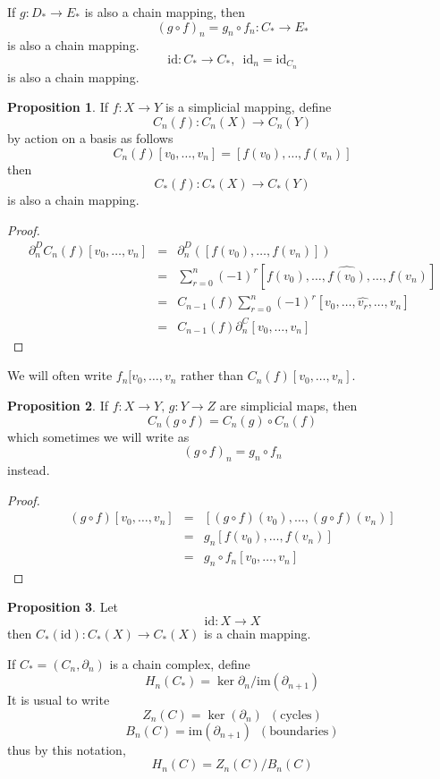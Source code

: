 \documentclass[a4paper,14pt]{extarticle}
\theoremstyle{definition}
\newtheorem*{proposition}{Proposition}
\begin{document}
If $g:D_*\rightarrow E_*$ is also a chain mapping, then \[(g\circ f)_n=g_n\circ f_n:C_*\rightarrow E_*\] is also a chain mapping. \[\text{id}:C_*\rightarrow C_*,
\,\,\,\text{id}_n=\text{id}_{C_n}\] is also a chain mapping. \\

\begin{proposition}
If $f:X\rightarrow Y$ is a simplicial mapping, define \[C_n(f):C_n(X)\rightarrow C_n(Y)\] by action on a basis as follows
\[C_n(f)[v_0,\ldots,v_n]=[f(v_0),\ldots,f(v_n)]\] then \[C_*(f):C_*(X)\rightarrow C_*(Y)\] is also a chain mapping.
\end{proposition}

\begin{proof}
\begin{eqnarray*}
	\partial_n^DC_n(f)[v_0,\ldots,v_n]&=&\partial_n^D([f(v_0),\ldots,f(v_n)]) \\
		&=&\sum_{r=0}^n (-1)^r[f(v_0),\ldots,\hat{f(v_0)},\ldots,f(v_n)] \\
		&=&C_{n-1}(f)\sum_{r=0}^n (-1)^r[v_0,\ldots,\hat{v_r},\ldots,v_n] \\
		&=&C_{n-1}(f)\partial_n^C[v_0,\ldots,v_n]
\end{eqnarray*}
\end{proof}

We will often write $f_n[v_0,\ldots,v_n$ rather than $C_n(f)[v_0,\ldots,v_n]$. \\

\begin{proposition}
If $f:X\rightarrow Y,\,g:Y\rightarrow Z$ are simplicial maps, then
\[C_n(g\circ f)=C_n(g)\circ C_n(f)\]
which sometimes we will write as \[(g\circ f)_n=g_n\circ f_n\] instead.
\end{proposition}

\begin{proof}
\begin{eqnarray*}
	(g\circ f)[v_0,\ldots,v_n]&=&[(g\circ f)(v_0),\ldots,(g\circ f)(v_n)] \\
				&=&g_n[f(v_0),\ldots,f(v_n)] \\
				&=&g_n\circ f_n[v_0,\ldots,v_n]
\end{eqnarray*}
\end{proof}

\begin{proposition}
Let \[\text{id}:X\rightarrow X\] then $C_*(\text{id}):C_*(X)\rightarrow C_*(X)$ is a chain mapping.
\end{proposition}

If $C_*=(C_n,\partial_n)$ is a chain complex, define \[H_n(C_*)=\ker\partial_n/\text{im}(\partial_{n+1})\]
It is usual to write \[Z_n(C)=\ker(\partial_n)\,\,\,(\text{cycles})\] \[B_n(C)=\text{im}(\partial_{n+1})\,\,\,(\text{boundaries})\]
thus by this notation, \[H_n(C)=Z_n(C)/B_n(C)\]
\end{document}

